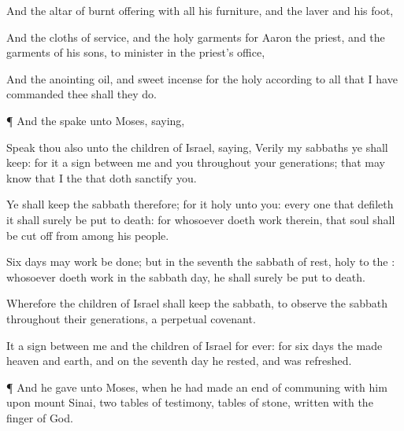 {And the
altar of burnt
offering with all his
furniture, and the
laver and his
foot,

And the
cloths of
service, and the
holy
garments for
Aaron the
priest, and the
garments of his
sons, to minister in the
priest’s office,

And the
anointing
oil, and
sweet
incense for the
holy
{} according to all that I have
commanded thee shall they
do.


\par }{\PP {}¶ And the
{}
spake unto
Moses,
saying,

Speak thou also unto the
children of
Israel,
saying,
Verily my
sabbaths ye shall
keep: for it
{} a
sign between me and you throughout your
generations; that
{} may
know that I
{} the
{} that doth
sanctify you.

Ye shall
keep the
sabbath therefore; for it
{}
holy unto you: every one that
defileth it shall
surely be put to
death: for whosoever
doeth
{}
work therein, that
soul shall be cut
off from
among his
people.

Six
days may
work be
done; but in the
seventh
{} the
sabbath of
rest,
holy to the
{}: whosoever
doeth
{}
work in the
sabbath
day, he shall
surely be put to
death.

Wherefore the
children of
Israel shall
keep the
sabbath, to
observe the
sabbath throughout their
generations,
{} a
perpetual
covenant.

It
{} a
sign between me and the
children of
Israel for
ever: for
{}
six
days the
{}
made
heaven and
earth, and on the
seventh
day he
rested, and was
refreshed.


\par }{\PP {}¶ And he
gave unto
Moses, when he had made an
end of
communing with him upon
mount
Sinai,
two
tables of
testimony,
tables of
stone,
written with the
finger of
God.




\par }
